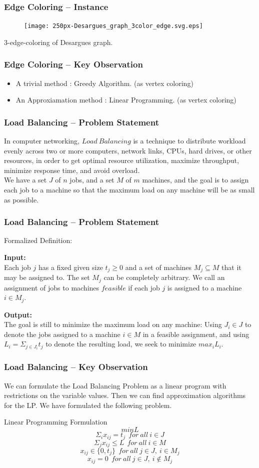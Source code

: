 \documentclass[slidestop,compress,mathserif]{beamer}
\begin{document}
\frame
{
\frametitle{Edge Coloring -- Instance}
\begin{figure}
 \texttt{[image: 250px-Desargues\_graph\_3color\_edge.svg.eps]}
\end{figure}
3-edge-coloring of Desargues graph.
}
\frame
{


\frametitle{Edge Coloring -- Key Observation}
\begin{itemize}
 \item A trivial method : Greedy Algorithm. (as vertex coloring)
 \item An Approxiamation method : Linear Programming. (as vertex coloring)
\end{itemize}

}
\frame
{
\frametitle{Load Balancing -- Problem Statement}
In computer networking, $Load\  Balancing$ is a technique to distribute workload evenly across two or more computers, network links, CPUs, hard drives, or other resources, in order to get optimal resource utilization, maximize throughput, minimize response time, and avoid overload.\\
We have a set $J$ of $n$ jobs, and a set $M$ of $m$ machines, and the goal is to assign each job to a machine so that the maximum load on any machine will be as small as possible.
}
\frame
{
\frametitle{Load Balancing -- Problem Statement}
\begin{block}{Formalized Definition:}

{ \bf Input: }\\
Each job $j$ has a fixed given size $t_j\geq 0$ and a set of machines $M_j\subseteq M$ that it may be assigned to. The set $M_j$ can be completely arbitrary. We call an assignment of jobs to machines $feasible$ if each job $j$ is assigned to a machine $i\in M_j.$

 {\bf Output: }\\
The goal is still to minimize the maximum load on any machine: Using $J_i\in J$ to denote the jobs assigned to a machine $i\in M$ in a feasible assignment, and using $L_i=\Sigma _{j\in J_i} t_j$ to denote the resulting load, we seek to minimize $max_i L_i$.


\end{block}
}

\frame
{


\frametitle{Load Balancing -- Key Observation}
We can formulate the Load Balancing Problem as a linear program with restrictions on the variable values. Then we can find approximation algorithms for the LP. We have formulated the following problem.
\begin{block}{Linear Programming Formulation}
 $$min L$$
$$\Sigma _i x_{ij} =t_j\ \ for\  all\  i\in J$$
$$\Sigma _j x_{ij} \leq L\ \ for \ all\ i\in M$$
$$x_{ij}\in \{0,t_j\}\ \ for\ all\ j\in J,\ i\in M_j$$
$$x_{ij}=0\ \ for \ all\ j\in J,\ i\notin M_j$$
\end{block}



}
\end{document}
